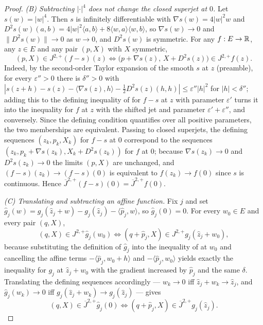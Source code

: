 \begin{proof}
\emph{(B) Subtracting $|\cdot|^4$ does not change the closed superjet at $0$.}
Let $s(w)=|w|^4$. Then $s$ is infinitely differentiable with
$\nabla s(w)=4|w|^2w$ and $D^2s(w)(a,b)=4|w|^2\langle a,b\rangle
+8\langle w,a\rangle\langle w,b\rangle$, so $\nabla s(w)\to0$ and
$\|D^2s(w)\|\to0$ as $w\to0$, and $D^2s(w)$ is symmetric. For any $f:E\to\mathbb{R}$,
any $z\in E$ and any pair $(p,X)$ with $X$ symmetric,
\begin{equation}\label{eq:srj-shift}
  (p,X)\in J^{2,+}(f-s)(z)
  \iff
  \bigl(p+\nabla s(z),\,X+D^2s(z)\bigr)\in J^{2,+}f(z).
\end{equation}
Indeed, by the second-order Taylor expansion of the smooth $s$ at $z$
(preamble), for every $\varepsilon''>0$ there is $\delta''>0$ with
$|s(z+h)-s(z)-\langle\nabla s(z),h\rangle-\tfrac12D^2s(z)(h,h)|
\le\varepsilon''|h|^2$ for $|h|<\delta''$; adding this to the defining
inequality of  for $f-s$ at $z$ with parameter
$\varepsilon'$ turns it into the inequality for $f$ at $z$ with the shifted jet
and parameter $\varepsilon'+\varepsilon''$, and conversely. Since the defining
condition quantifies over all positive parameters, the two memberships are
equivalent. Passing to closed superjets, the defining sequences
$(z_k,p_k,X_k)$ for $f-s$ at $0$ correspond to the sequences
$(z_k,p_k+\nabla s(z_k),X_k+D^2s(z_k))$ for $f$ at $0$; because
$\nabla s(z_k)\to0$ and $D^2s(z_k)\to0$ the limits $(p,X)$ are unchanged, and
$(f-s)(z_k)\to(f-s)(0)$ is equivalent to $f(z_k)\to f(0)$ since $s$ is
continuous. Hence
$\overline J^{2,+}(f-s)(0)=\overline J^{2,+}f(0)$.

\emph{(C) Translating and subtracting an affine function.}
Fix $j$ and set $\widehat g_j(w)=g_j(\widehat z_j+w)-g_j(\widehat z_j)
-\langle\widehat p_j,w\rangle$, so $\widehat g_j(0)=0$. For every $w_0\in E$ and
every pair $(q,X)$,
\[
  (q,X)\in J^{2,+}\widehat g_j(w_0)
  \iff
  (q+\widehat p_j,X)\in J^{2,+}g_j(\widehat z_j+w_0),
\]
because substituting the definition of $\widehat g_j$ into the inequality of
 at $w_0$ and cancelling the affine terms
$-\langle\widehat p_j,w_0+h\rangle$ and $-\langle\widehat p_j,w_0\rangle$ yields
exactly the inequality for $g_j$ at $\widehat z_j+w_0$ with the gradient
increased by $\widehat p_j$ and the same $\delta$. Translating the defining
sequences accordingly --- $w_k\to0$ iff $\widehat z_j+w_k\to\widehat z_j$, and
$\widehat g_j(w_k)\to0$ iff $g_j(\widehat z_j+w_k)\to g_j(\widehat z_j)$ ---
gives
\begin{equation}\label{eq:srj-translate}
  (q,X)\in\overline J^{2,+}\widehat g_j(0)
  \iff
  (q+\widehat p_j,X)\in\overline J^{2,+}g_j(\widehat z_j).
\end{equation}


\end{proof}

